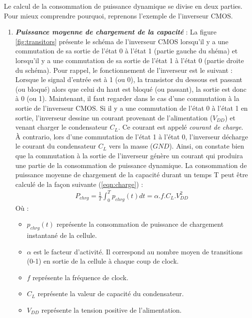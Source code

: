 \documentclass[10pt, oneside, a4paper]{article}
\begin{document}
\vspace{+0.5 cm}\hspace{-0.5 cm}

Le calcul de la consommation de puissance dynamique se divise en deux parties. Pour mieux comprendre pourquoi, reprenons l'exemple de l'inverseur CMOS.

\begin{enumerate}
\vspace{-0.2 cm}\item \textbf{\textit{Puissance moyenne de chargement de la capacité}} : La figure \ref{fig:transitors} présente le schéma de l'inverseur CMOS lorsqu'il y a une commutation de sa sortie de l'état 0 à l'état 1 (partie gauche du shéma) et lorsqu'il y a une commutation de sa sortie de l'état 1 à l'état 0 (partie droite du schéma). Pour rappel, le fonctionnement de l'inverseur est le suivant : Lorsque le signal d'entrée est à 1 (ou 0), la transistor du dessous est passant (ou bloqué) alors que celui du haut est bloqué (ou passant), la sortie est donc à 0 (ou 1). Maintenant, il faut regarder dans le cas d'une commutation à la sortie de l'inverseur CMOS. Si il y a une commutation de l'état 0 à l'état 1 en sortie, l'inverseur dessine un courant provenant de l'alimentation ($V_{DD}$) et venant charger le condensateur $C_L$. Ce courant est appelé \textit{courant de charge}. À contrario, lors d'une commutation de l'état 1 à l'état 0, l'inverseur décharge le courant du condensateur $C_L$ vers la masse ($GND$). Ainsi, on constate bien que la commutation à la sortie de l'inverseur génère un courant qui produira une partie de la consommation de puissance dynamique. La consommation de puissance moyenne de chargement de la capacité durant un temps T peut être calculé de la façon suivante (\ref{eqn:charge}) :
\begin{gather}
	P_{chrg} = \frac{1}{T}\int_{0}^{T}p_{chrg}(t)dt=\alpha.f.C_{L}.V_{DD}^{2}\label{eqn:charge}
\end{gather}
Où : 
\begin{itemize}
\item $p_{chrg}(t)$ représente la consommation de puissance de chargement instantané de la cellule.
\item $\alpha$ est le facteur d'activité. Il correspond au nombre moyen de transitions (0-1) en sortie de la cellule à chaque coup de clock.
\item $f$ représente la fréquence de clock.
\item $C_L$ représente la valeur de capacité du condensateur.
\item $V_{DD}$ représente la tension positive de l'alimentation. \\
\end{itemize}



\end{enumerate}
\end{document}
